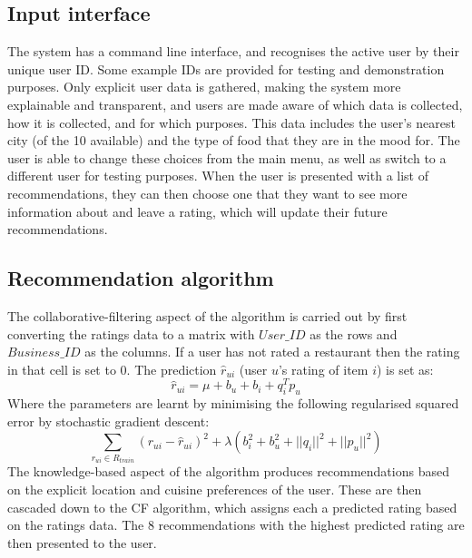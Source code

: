 \documentclass[conference]{IEEEtran}
\begin{document}
\subsection{Input interface}
The system has a command line interface, and recognises the active user by their unique user ID. 
Some example IDs are provided for testing and demonstration purposes. 
Only explicit user data is gathered, making the system more explainable and transparent, 
and users are made aware of which data is collected, how it is collected, and for which purposes. 
This data includes the user's nearest city (of the 10 available) and the type of food that 
they are in the mood for. 
The user is able to change these choices from the main menu, as well as switch to a different user 
for testing purposes. 
When the user is presented with a list of recommendations, they can then choose one that they want 
to see more information about and leave a rating, which will update their future recommendations. 

\subsection{Recommendation algorithm}
The collaborative-filtering aspect of the algorithm is carried out by first converting the ratings data to a 
matrix with $User\_ID$ as the rows and $Business\_ID$ as the columns. 
If a user has not rated a restaurant then the rating in that cell is set to 0. 
The prediction $\widehat{r}_{ui}$ (user $u$'s rating of item $i$) is set as:
\begin{equation}
    \widehat{r}_{ui} = \mu + b_u + b_i + q_i^Tp_u
\end{equation}
Where the parameters are learnt by minimising the following regularised squared error by stochastic gradient descent: 
\begin{equation}
    \sum_{r_{ui}\in{R_{train}}} (r_{ui} - \widehat{r}_{ui})^2 + \lambda(b_i^2 + b_u^2 + ||q_i||^2 + ||p_u||^2)
\end{equation}
The knowledge-based aspect of the algorithm produces recommendations based on the explicit location and cuisine 
preferences of the user. 
These are then cascaded down to the CF algorithm, which assigns each a predicted rating based on the ratings data. 
The 8 recommendations with the highest predicted rating are then presented to the user. 
\end{document}
